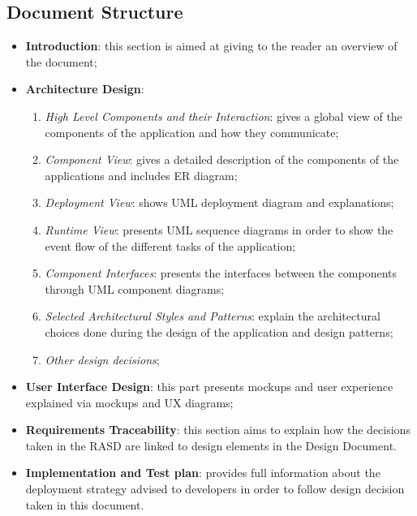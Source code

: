 \documentclass[a4paper]{article}
\begin{document}
\subsection{Document Structure}
\begin{itemize}
    \item \textbf{Introduction}: this section is aimed at giving to the reader an overview of the document;

\item \textbf{Architecture Design}:
\begin{enumerate}
    \item \textit{High Level Components and their Interaction}: gives a global view of the components of the application and how they communicate;

    \item \textit{Component View}: gives a detailed description of the components of the applications and includes ER diagram;

    \item \textit{Deployment View}: shows UML deployment diagram and explanations;

    \item \textit{Runtime View}: presents UML sequence diagrams in order to show the event flow of the different tasks of the application;

    \item \textit{Component Interfaces}: presents the interfaces between the components through UML component diagrams;

    \item \textit{Selected Architectural Styles and Patterns}: explain the architectural choices done during the design of the application and design patterns;

    \item \textit{Other design decisions};
\end{enumerate}

\item \textbf{User Interface Design}: this part presents mockups and user experience explained via mockups and UX diagrams;

\item \textbf{Requirements Traceability}: this section aims to explain how the decisions taken in the RASD are linked to design elements in the Design Document.

\item \textbf{Implementation and Test plan}: provides full information about the deployment strategy advised to developers in order to follow design decision taken in this document.
\end{itemize}
\end{document}
